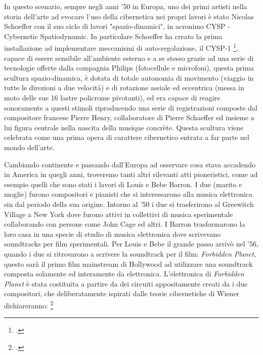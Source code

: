 In questo scenario, sempre negli anni '50 in Europa, uno dei primi artisti nella storia dell'arte
ad evocare l'uso della cibernetica nei propri lavori è stato
Nicolas Schoeffer con il suo ciclo di lavori "spazio-dinamici", in acronimo
CYSP - Cybernetic Spatiodynamic.
In particolare Schoeffer ha creato la prima installazione ad implementare meccanismi
di auto-regolazione, il CYSP-1 \footcite{sanfilippovallefeedsys},
capace di essere sensibile all'ambiente esterno e a se stesso
grazie ad una serie di tecnologie offerte dalla compagnia Philips (fotocellule e microfoni),
questa prima scultura spazio-dinamica, è dotata di totale autonomia di movimento
(viaggio in tutte le direzioni a due velocità) e di rotazione assiale ed eccentrica
(messa in moto delle sue 16 lastre policrome pivotanti),
ed era capace di reagire sonoramente a questi stimoli riproducendo
una serie di registrazioni composte dal compositore francese Pierre Henry,
collaboratore di Pierre Schaeffer ed insieme a lui figura centrale nella nascita della musique concrète.
Questa scultura viene celebrata come una prima opera di carattere cibernetico 
entrata a far parte nel mondo dell'arte.

Cambiando continente e passando dall'Europa ad osservare cosa stava accadendo
in America in quegli anni, troveremo tanti altri rilevanti atti pioneristici,
come ad esempio quelli che sono stati i lavori di Louis e Bebe Barron.
I due (marito e moglie) furono compositori e pianisti che si
interessarono alla musica elettronica sin dal periodo della sua origine.
Intorno al '50 i due si trasferirono al Greewitch Village a New York
dove furono attivi in collettivi di musica sperimentale
collaborando con persone come John Cage ed altri.
I Barron trasformarono
la loro casa in una specie di studio di musica elettronica
dove scrivevano soundtracks per film sperimentali.
Per Louis e Bebe il grande passo arrivò nel
'56, quando i due si ritrovarono a scrivere la soundtrack per il film:
\textit{Forbidden Planet},
questo sarà il primo film mainstream di Hollywood ad utilizzare una soundtrack
composta solamente ed interamente da elettronica.
L'elettronica di \textit{Forbidden Planet} è stata
costituita a partire da dei circuiti appositamente creati da i due compositori,
che deliberatamente ispirati dalle teorie cibernetiche di Wiener
dichiareranno: \footcite{dunbarlisteningcyb}

